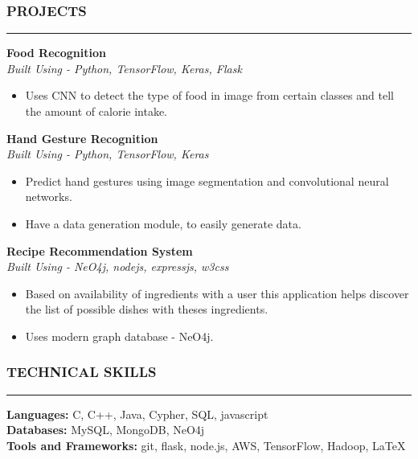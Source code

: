 \documentclass[a4paper]{article}
\begin{document}
\subsubsection*{PROJECTS}
\hrule
\vspace{10pt}

\noindent
\textbf{Food Recognition} \\
\textit{Built Using - Python, TensorFlow, Keras, Flask}
\begin{itemize} [leftmargin=*, nosep]
    \item Uses CNN to detect the type of food in image from certain classes and tell the amount of calorie intake.
\end{itemize}

\vspace{10pt}
\noindent
\textbf{Hand Gesture Recognition} \\
\textit{Built Using - Python, TensorFlow, Keras}
\begin{itemize} [leftmargin=*, nosep]
    \item Predict hand gestures using image segmentation and convolutional neural networks.
    \item Have a data generation module, to easily generate data.
\end{itemize}

\vspace{10pt}
\noindent
\textbf{Recipe Recommendation System} \\
\textit{Built Using - NeO4j, nodejs, expressjs, w3css}
\begin{itemize}[leftmargin=*, nosep]
    \item Based on availability of ingredients with a user this application
          helps discover the list of possible dishes with theses ingredients.
    \item Uses modern graph database - NeO4j.
\end{itemize}

\subsubsection*{TECHNICAL SKILLS}
\hrule
\vspace{10pt}
\textbf{Languages: } C, C++, Java, Cypher, SQL, javascript \\
\textbf{Databases: } MySQL, MongoDB, NeO4j \\
\textbf{Tools and Frameworks: } git, flask, node.js, AWS, TensorFlow, Hadoop, \LaTeX
\end{document}
